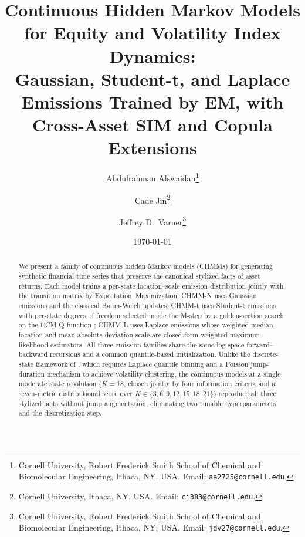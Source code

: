 \documentclass[11pt,a4paper]{article}
\title{Continuous Hidden Markov Models for Equity and Volatility Index Dynamics:\\Gaussian, Student-t, and Laplace Emissions Trained by EM, with Cross-Asset SIM and Copula Extensions}
\author{
    Abdulrahman Alswaidan\thanks{Cornell University, Robert Frederick Smith School of Chemical and Biomolecular Engineering, Ithaca, NY, USA. Email: \texttt{aa2725@cornell.edu}.}
    \and
    Cade Jin\thanks{Cornell University, Ithaca, NY, USA. Email: \texttt{cj383@cornell.edu}.}
    \and
    Jeffrey D.\ Varner\thanks{Cornell University, Robert Frederick Smith School of Chemical and Biomolecular Engineering, Ithaca, NY, USA. Email: \texttt{jdv27@cornell.edu}.}
}
\date{\today}
\begin{document}
\maketitle

\begin{abstract}
We present a family of continuous hidden Markov models (CHMMs) for generating synthetic financial time series that preserve the canonical stylized facts of asset returns.
Each model trains a per-state location--scale emission distribution jointly with the transition matrix by Expectation--Maximization: CHMM-N uses Gaussian emissions and the classical Baum-Welch updates; CHMM-t uses Student-t emissions with per-state degrees of freedom selected inside the M-step by a golden-section search on the ECM Q-function \citep{peel2000robust, liu1995ml}; CHMM-L uses Laplace emissions whose weighted-median location and mean-absolute-deviation scale are closed-form weighted maximum-likelihood estimators.
All three emission families share the same log-space forward--backward recursions and a common quantile-based initialization.
Unlike the discrete-state framework of \citet{alswaidan2026hybrid}, which requires Laplace quantile binning and a Poisson jump-duration mechanism to achieve volatility clustering, the continuous models at a single moderate state resolution ($K = 18$, chosen jointly by four information criteria \citep{nguyen2018hidden} and a seven-metric distributional score over $K \in \{3, 6, 9, 12, 15, 18, 21\}$) reproduce all three stylized facts without jump augmentation, eliminating two tunable hyperparameters and the discretization step.


\end{abstract}
\end{document}
